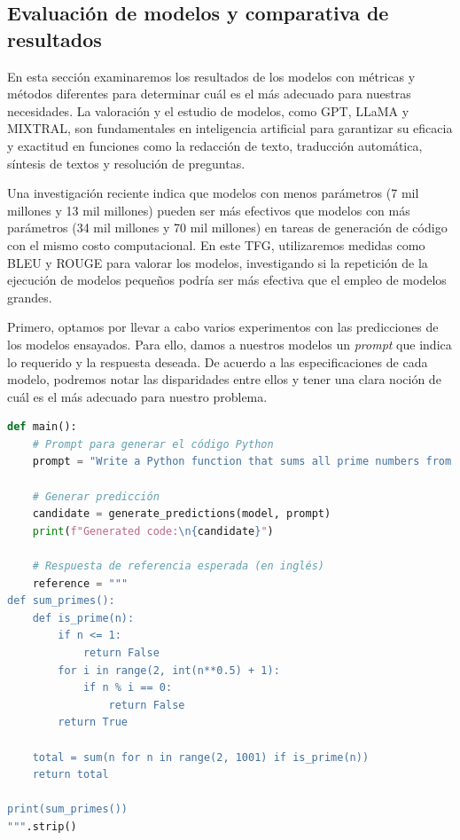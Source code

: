 \subsection{Evaluación de modelos y comparativa de resultados}
\label{subsec:evaluaciónmodelos}

En esta sección examinaremos los resultados de los modelos con métricas y métodos diferentes para determinar cuál es el más adecuado para nuestras necesidades. La valoración y el estudio de modelos, como \acrshort{GPT}, \acrshort{LLaMA} y MIXTRAL, son fundamentales en inteligencia artificial para garantizar su eficacia y exactitud en funciones como la redacción de texto, traducción automática, síntesis de textos y resolución de preguntas.

\bigskip %

Una investigación reciente \cite{hassid2024larger} indica que modelos con menos parámetros (7 mil millones y 13 mil millones) pueden ser más efectivos que modelos con más parámetros (34 mil millones y 70 mil millones) en tareas de generación de código con el mismo costo computacional. En este \acrshort{TFG}, utilizaremos medidas como \acrshort{BLEU} y ROUGE para valorar los modelos, investigando si la repetición de la ejecución de modelos pequeños podría ser más efectiva que el empleo de modelos grandes.

\bigskip %

Primero, optamos por llevar a cabo varios experimentos con las predicciones de los modelos ensayados. Para ello, damos a nuestros modelos un \textit{prompt} que indica lo requerido y la respuesta deseada. De acuerdo a las especificaciones de cada modelo, podremos notar las disparidades entre ellos y tener una clara noción de cuál es el más adecuado para nuestro problema.

\bigskip %

\begin{lstlisting}[language=Python, caption={Prompt y salida de referencia.}, label=listado6]
def main():
    # Prompt para generar el código Python
    prompt = "Write a Python function that sums all prime numbers from 1 to 1000."

    # Generar predicción
    candidate = generate_predictions(model, prompt)
    print(f"Generated code:\n{candidate}")

    # Respuesta de referencia esperada (en inglés)
    reference = """
def sum_primes():
    def is_prime(n):
        if n <= 1:
            return False
        for i in range(2, int(n**0.5) + 1):
            if n % i == 0:
                return False
        return True

    total = sum(n for n in range(2, 1001) if is_prime(n))
    return total

print(sum_primes())
""".strip()

\end{lstlisting}


